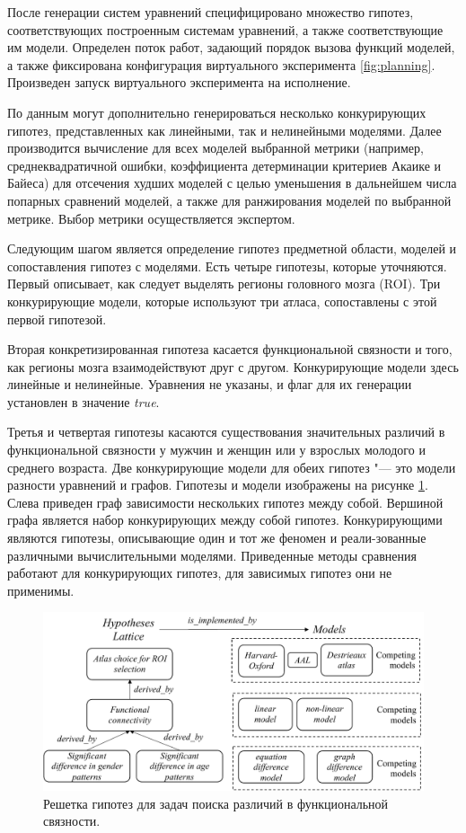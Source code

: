 После генерации систем уравнений специфицировано множество гипотез, соответствующих построенным системам уравнений, 
а также соответствующие им модели. Определен поток работ, задающий порядок вызова функций моделей, а также 
фиксирована конфигурация виртуального эксперимента \cref{fig:planning}. Произведен запуск виртуального эксперимента на исполнение.

По данным могут дополнительно генерироваться несколько конкурирующих гипотез, 
представленных как линейными, так и нелинейными моделями. Далее производится вычисление 
для всех моделей выбранной метрики (например, среднеквадратичной ошибки, коэффициента детерминации критериев 
Акаике и Байеса) для отсечения худших моделей с целью уменьшения в дальнейшем числа попарных сравнений моделей, 
а также для ранжирования моделей по выбранной метрике. Выбор метрики осуществляется экспертом. 

Следующим шагом является определение гипотез предметной области, моделей и сопоставления гипотез с моделями. 
Есть четыре гипотезы, которые уточняются. Первый описывает, как следует выделять регионы головного мозга (ROI). 
Три конкурирующие модели, которые используют три атласа, сопоставлены с этой первой гипотезой. 

Вторая конкретизированная гипотеза касается функциональной связности и того, как регионы мозга 
взаимодействуют друг с другом. 
Конкурирующие модели здесь линейные и нелинейные. Уравнения не указаны, и флаг для их генерации 
установлен в значение \textit{true}. 

Третья и четвертая гипотезы касаются существования значительных различий в функциональной связности у 
мужчин и женщин или у взрослых молодого и среднего возраста. Две конкурирующие модели для обеих гипотез "--- это 
модели разности уравнений и графов. Гипотезы и модели изображены на рисунке \cref{fig:Hypothesis_lattice}. 
Слева приведен граф зависимости нескольких гипотез между собой. 
Вершиной графа является набор конкурирующих между собой гипотез. Конкурирующими являются гипотезы, описывающие 
один и тот же феномен и реали-зованные различными вычислительными моделями. Приведенные методы сравнения работают 
для конкурирующих гипотез, для зависимых гипотез они не применимы.

\begin{figure}[ht]
    \centering
    \includegraphics[width=1.0\linewidth]{images/Hypothesis_Lattice.pdf}
    \caption{Решетка гипотез для задач поиска различий в функциональной связности.}\label{fig:Hypothesis_lattice}
\end{figure}

